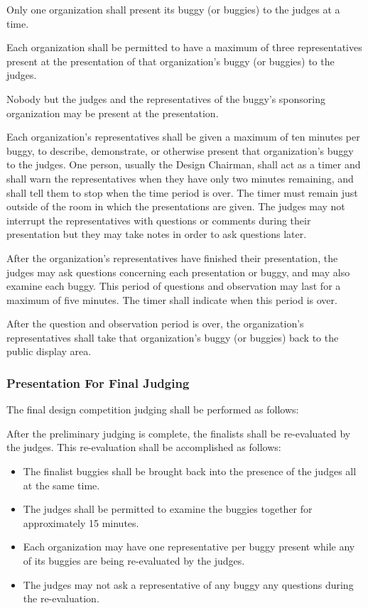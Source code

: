 	Only one organization shall present its buggy (or buggies) to the judges at a
	time.

	Each organization shall be permitted to have a maximum of three representatives
	present at the presentation of that organization's buggy (or buggies) to the
	judges.

	Nobody but the judges and the representatives of the buggy's sponsoring
	organization may be present at the presentation.

	Each organization's representatives shall be given a maximum of ten minutes per
	buggy, to describe, demonstrate, or otherwise present that organization's buggy
	to the judges. One person, usually the Design Chairman, shall act as a timer
	and shall warn the representatives when they have only two minutes remaining,
	and shall tell them to stop when the time period is over. The timer must remain
	just outside of the room in which the presentations are given. The judges may
	not interrupt the representatives with questions or comments during their
	presentation but they may take notes in order to ask questions later.

	After the organization's representatives have finished their presentation, the
	judges may ask questions concerning each presentation or buggy, and may also
	examine each buggy. This period of questions and observation may last for a
	maximum of five minutes. The timer shall indicate when this period is over.

	After the question and observation period is over, the organization's
	representatives shall take that organization's buggy (or buggies) back to the
	public display area.

\subsubsection{Presentation For Final Judging}

	The final design competition judging shall be performed as follows:

	After the preliminary judging is complete, the finalists shall be re-evaluated
	by the judges. This re-evaluation shall be accomplished as follows:

	\begin{itemize}
		\item The finalist buggies shall be brought back into the presence of the judges all at the same time.
		\item The judges shall be permitted to examine the buggies together for approximately 15 minutes.
		\item Each organization may have one representative per buggy present while any of its buggies are being re-evaluated by the judges.
		\item The judges may not ask a representative of any buggy any questions during the re-evaluation.
	\end{itemize}

